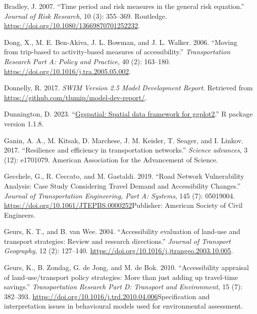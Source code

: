 \documentclass[]{ascelike-new}
\newlength{\cslhangindent}
\newenvironment{CSLReferences}[2] %
 {\begin{list}{}{%
  \setlength{\itemindent}{0pt}
  \setlength{\leftmargin}{0pt}
  \setlength{\parsep}{0pt}
  \ifodd #1
   \setlength{\leftmargin}{\cslhangindent}
   \setlength{\itemindent}{-1\cslhangindent}
  \fi
  \setlength{\itemsep}{#2\baselineskip}}}
 {\end{list}}
\begin{document}
\begin{CSLReferences}{1}{0}
Bradley, J. 2007. {``Time period and risk measures in the general risk
equation.''} \emph{Journal of Risk Research}, 10 (3): 355--369.
Routledge. \url{https://doi.org/10.1080/13669870701252232}.

Dong, X., M. E. Ben-Akiva, J. L. Bowman, and J. L. Walker. 2006.
{``Moving from trip-based to activity-based measures of
accessibility.''} \emph{Transportation Research Part A: Policy and
Practice}, 40 (2): 163--180.
\url{https://doi.org/10.1016/j.tra.2005.05.002}.

Donnelly, R. 2017. \emph{{SWIM Version 2.5 Model Development Report}}.
Retrieved from \url{https://github.com/tlumip/model-dev-report/}.

Dunnington, D. 2023.
{``\href{https://CRAN.R-project.org/package=ggspatial}{Ggspatial:
Spatial data framework for ggplot2}.''} R package version 1.1.8.

Ganin, A. A., M. Kitsak, D. Marchese, J. M. Keisler, T. Seager, and I.
Linkov. 2017. {``Resilience and efficiency in transportation
networks.''} \emph{Science advances}, 3 (12): e1701079. American
Association for the Advancement of Science.

Gecchele, G., R. Ceccato, and M. Gastaldi. 2019. {``Road Network
Vulnerability Analysis: Case Study Considering Travel Demand and
Accessibility Changes.''} \emph{Journal of Transportation Engineering,
Part A: Systems}, 145 (7): 05019004.
\url{https://doi.org/10.1061/JTEPBS.0000252}Publisher: American Society
of Civil Engineers.

Geurs, K. T., and B. van Wee. 2004. {``Accessibility evaluation of
land-use and transport strategies: Review and research directions.''}
\emph{Journal of Transport Geography}, 12 (2): 127--140.
\url{https://doi.org/10.1016/j.jtrangeo.2003.10.005}.

Geurs, K., B. Zondag, G. de Jong, and M. de Bok. 2010. {``Accessibility
appraisal of land-use/transport policy strategies: More than just adding
up travel-time savings.''} \emph{Transportation Research Part D:
Transport and Environment}, 15 (7): 382--393.
\url{https://doi.org/10.1016/j.trd.2010.04.006}Specification and
interpretation issues in behavioural models used for environmental
assessment.


\end{CSLReferences}
\end{document}
